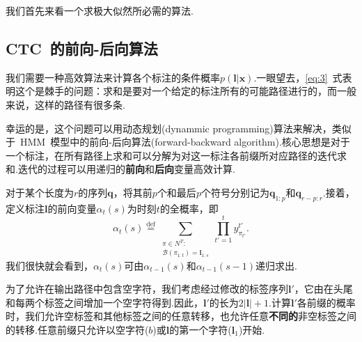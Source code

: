 \documentclass{ctexart}
\def\cB{\mathcal{B}}
\def\vl{\mathbf{l}}
\def\vx{\mathbf{x}}
\def\vq{\mathbf{q}}
\def\defeq{\overset{\mathrm{def}}{=}}
\begin{document}
我们首先来看一个求极大似然所必需的算法.
\subsection{CTC~的前向-后向算法}
\label{sec:forward-backward}
我们需要一种高效算法来计算各个标注的条件概率$p(\vl|\vx)$.一眼望去，\eqref{eq:3}~式表明这个是棘手的问题：求和是要对一个给定的标注所有的可能路径进行的，而一般来说，这样的路径有很多条.

幸运的是，这个问题可以用动态规划(dynammic programming)算法来解决，类似于~HMM~模型中的前向-后向算法(forward-backward algorithm).核心思想是对于一个标注，在所有路径上求和可以分解为对这一标注各前缀所对应路径的迭代求和.迭代的过程可以用递归的\textbf{前向}和\textbf{后向}变量高效计算.

对于某个长度为$r$的序列$\vq$，将其前$p$个和最后$p$个符号分别记为$\vq_{1:p}$和$\vq_{r-p:r}$.接着，定义标注$\vl$的前向变量$\alpha_t(s)$为时刻$t$的全概率，即
\begin{equation}
	\label{eq:5}
	\alpha_t(s)
	\defeq
	\sum_{
		\substack{
			\pi\in N^T:\\
			\cB(\pi_{1:t}) = \vl_{1:s}
		}
	}
	\prod_{t'=1}^t y_{\pi_{t'}}^{t'}.
\end{equation}
我们很快就会看到，$\alpha_t(s)$可由$\alpha_{t-1}(s)$和$\alpha_{t-1}(s-1)$递归求出.

为了允许在输出路径中包含空字符，我们考虑经过修改的标签序列$\vl'$，它由在头尾和每两个标签之间增加一个空字符得到.因此，$\vl'$的长为$2|\vl|+1$.计算$\vl'$各前缀的概率时，我们允许空标签和其他标签之间的任意转移，也允许任意\textbf{不同的}非空标签之间的转移.任意前缀只允许以空字符($b$)或$\vl$的第一个字符($\vl_1$)开始.
\end{document}
